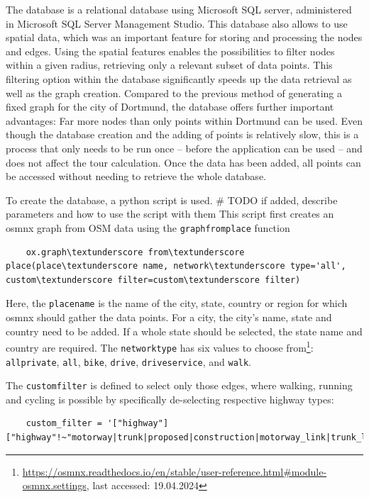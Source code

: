 The database is a relational database using Microsoft SQL server, administered in Microsoft SQL Server Management Studio.
This database also allows to use spatial data, which was an important feature for storing and processing the nodes and edges.
Using the spatial features enables the possibilities to filter nodes within a given radius, retrieving only a relevant subset of data points.
This filtering option within the database significantly speeds up the data retrieval as well as the graph creation.
Compared to the previous method of generating a fixed graph for the city of Dortmund, the database offers further important advantages:
Far more nodes than only points within Dortmund can be used.
Even though the database creation and the adding of points is relatively slow, this is a process that only needs to be run once -- before the application can be used -- and does not affect the tour calculation. 
Once the data has been added, all points can be accessed without needing to retrieve the whole database.

To create the database, a python script is used. \# TODO if added, describe parameters and how to use the script with them
This script first creates an osmnx graph from OSM data using the \texttt{graph\textunderscore from\textunderscore place} function
\begin{lstlisting}
	ox.graph\textunderscore from\textunderscore place(place\textunderscore name, network\textunderscore type='all', custom\textunderscore filter=custom\textunderscore filter)
\end{lstlisting}

Here, the \texttt{place\textunderscore name} is the name of the city, state, country or region for which osmnx should gather the data points.
For a city, the city's name, state and country need to be added. 
If a whole state should be selected, the state name and country are required.
The \texttt{network\textunderscore type} has six values to choose from\footnote{\url{https://osmnx.readthedocs.io/en/stable/user-reference.html\#module-osmnx.settings}, last accessed: 19.04.2024}: \texttt{all\textunderscore private}, \texttt{all}, \texttt{bike}, \texttt{drive}, \texttt{drive\textunderscore service}, and \texttt{walk}. 

The \texttt{custom\textunderscore filter} is defined to select only those edges, where walking, running and cycling is possible by specifically de-selecting respective highway types:

\begin{lstlisting}
	custom_filter = '["highway"]["highway"!~"motorway|trunk|proposed|construction|motorway_link|trunk_link"]'
\end{lstlisting}

